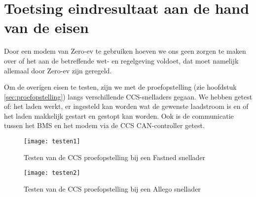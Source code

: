 \chapter{Toetsing eindresultaat aan de hand van de eisen}
\label{Toetsing_eindresultaat_aan_de_hand_van_de_eisen}

Door een modem van Zero-ev te gebruiken hoeven we ons geen zorgen te maken over
of het aan de betreffende wet- en regelgeving voldoet, dat moet namelijk
allemaal door Zero-ev zijn geregeld. 

Om de overigen eisen te testen, zijn we met de proefopstelling (zie hoofdstuk
\ref{sec:proefopstelling}) langs verschillende CCS-snelladers gegaan. We hebben
getest of: het laden werkt, er ingesteld kan worden wat de gewenste laadstroom
is en of het laden makkelijk gestart en gestopt kan worden. Ook is de
communicatie tussen het BMS en het modem via de CCS CAN-controller getest.



\begin{figure}[]
    \centering
    \begin{minipage}{0.45\textwidth}
        \centerline{\texttt{[image: testen1]}}
        \caption{Testen van de CCS proefopstelling bij een Fastned snellader}
        \label{fig:testen1}
    \end{minipage}\hfill
    \begin{minipage}{0.45\textwidth}
        \centerline{\texttt{[image: testen2]}}
        \caption{Testen van de CCS proefopstelling bij een Allego snellader}
        \label{fig:testen2}
    \end{minipage}
\end{figure}